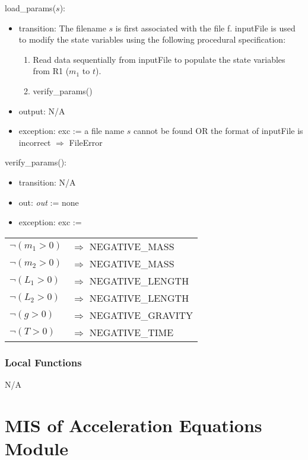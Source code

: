 \documentclass[12pt, titlepage]{article}
\begin{document}
\noindent load\_params($s$):
\begin{itemize}
\item transition: The filename $s$ is first associated with the file f.  {inputFile} is used to
  modify the state variables using the following procedural specification:
\begin{enumerate}
\item Read data sequentially from inputFile to populate the state variables from
  R1 ($m_1$ to $\mathit{t}$).


\item verify\_params()


\end{enumerate}
\item output: N/A
\item exception: exc := a file name $s$ cannot be found OR the format of
  inputFile is incorrect $\Rightarrow$  FileError
\end{itemize}

\noindent verify\_params():
\begin{itemize}
\item transition: N/A
\item out: \textit{out} := none
\item exception: exc := 
\end{itemize}
\noindent \begin{longtable*}[l]{l l} 
$\neg (m_1 > 0)$ & $\Rightarrow$ NEGATIVE\_MASS\\
$\neg (m_2 > 0)$ & $\Rightarrow$ NEGATIVE\_MASS\\
$\neg (L_1 > 0)$ & $\Rightarrow$ NEGATIVE\_LENGTH\\
$\neg (L_2 > 0)$ & $\Rightarrow$ NEGATIVE\_LENGTH\\
$\neg (g > 0)$ & $\Rightarrow$ NEGATIVE\_GRAVITY\\
$\neg (T> 0)$ & $\Rightarrow$ NEGATIVE\_TIME\\
\end{longtable*}

\subsubsection{Local Functions}
N/A

\newpage


\section{MIS of Acceleration Equations Module} \label{AEModule} 
 
\end{document}

